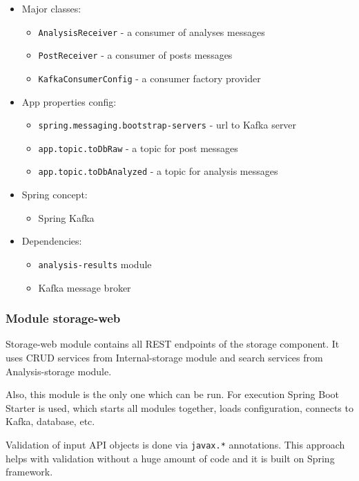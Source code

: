 \begin{itemize}
    \item Major classes:
        \begin{itemize}
            \item \texttt{AnalysisReceiver} - a consumer of analyses messages
            \item \texttt{PostReceiver} - a consumer of posts messages
            \item \texttt{KafkaConsumerConfig} - a consumer factory provider
        \end{itemize}
    \item App properties config:
        \begin{itemize}
            \item \texttt{spring.messaging.bootstrap-servers} - url to Kafka server
            \item \texttt{app.topic.toDbRaw} - a topic for post messages
            \item \texttt{app.topic.toDbAnalyzed} - a topic for analysis messages
        \end{itemize}
    \item Spring concept:
        \begin{itemize}
            \item Spring Kafka 
        \end{itemize}
    \item Dependencies:
        \begin{itemize}
            \item \texttt{analysis-results} module
            \item Kafka message broker
        \end{itemize}
\end{itemize}

\subsubsection{Module storage-web}

Storage-web module contains all REST endpoints of the storage component. It uses CRUD services from Internal-storage module and search services from Analysis-storage module.

Also, this module is the only one which can be run. For execution Spring Boot Starter is used, which starts all modules together, loads configuration, connects to Kafka, database, etc.

Validation of input API objects is done via \texttt{javax.*} annotations. This approach helps with validation without a huge amount of code and it is built on Spring framework.

